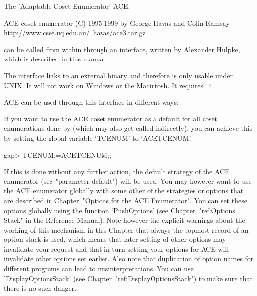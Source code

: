 
\def\ACE{{\sf ACE}}

The  'Adaptable Coset Enumerator' {\ACE}:

\begintt
ACE coset enumerator (C) 1995-1999 by George Havas and Colin Ramsay
    http://www.csee.uq.edu.au/~havas/ace3.tar.gz
\endtt

can  be called  from within  {\GAP} through  an interface,  written by
Alexander Hulpke, which is described in this manual.

The interface links to an external binary and therefore is only usable
under UNIX. It will not work  on Windows or the Macintosh. It requires
{\GAP}~4.

{\ACE} can be used through this interface in different ways:


If you  want to use the {\ACE}  coset enumerator as a  default for all
coset  enumerations  done  by   {\GAP}  (which  may  also  get  called
indirectly),  you can  achieve  this by  setting  the global  variable
`TCENUM' to `ACETCENUM'.

\begintt
gap> TCENUM:=ACETCENUM;;
\endtt

If this  is done without any  further action, the  default strategy of
the {\ACE} enumerator (see~"parameter default") will be used.  You may
however want to use the  {\ACE} enumerator globally with some other of
the strategies  or options that are described  in Chapter~"Options for
the ACE  Enumerator".  You  can set these  options globally  using the
function `PushOptions' (see  Chapter~"ref:Options Stack" in the {\GAP}
Reference  Manual).   Note however  the  explicit  warnings about  the
working  of this  mechanism in  this Chapter  that always  the topmost
record of an  option stack is used, which means  that later setting of
other options  may invalidate  your request and  that in  turn setting
your  options for {\ACE}  will invalidate  other options  set earlier.
Also note that duplication of  option names for different programs can
lead  to misinterpretations.  You  can use  'DisplayOptionsStack' (see
Chapter~"ref:DisplayOptionsStack") to make sure  that there is no such
danger.

